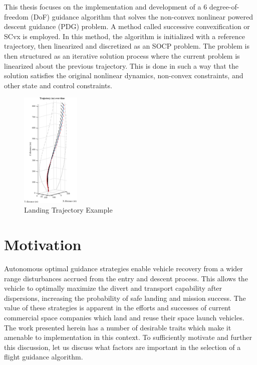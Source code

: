 This thesis focuses on the implementation and development of a 6 degree-of-freedom (DoF) guidance algorithm that solves the non-convex nonlinear powered descent guidance (PDG) problem. A method called successive convexification or SCvx is employed. In this method, the algorithm is initialized with a reference trajectory, then linearized and discretized as an SOCP problem. The problem is then structured as an iterative solution process where the current problem is linearized about the previous trajectory. This is done in such a way that the solution satisfies the original nonlinear dynamics, non-convex constraints, and other state and control constraints. 
\begin{figure}[!htbp] 
  \centering
  \includegraphics[width=0.25\textwidth]{figs/3dtraj_intro.eps}
  \caption{Landing Trajectory Example}
  \label{fig:intro}
 \end{figure}	



\section{Motivation}
Autonomous optimal guidance strategies enable vehicle recovery from a wider range disturbances accrued from the entry and descent process. This allows the vehicle to optimally maximize the divert and transport capability after dispersions, increasing the probability of safe landing and mission success. The value of these strategies is apparent in the efforts and successes of current commercial space companies which land and reuse their space launch vehicles. The work presented herein has a number of desirable traits which make it amenable to implementation in this context. To sufficiently motivate and further this discussion, let us discuss what factors are important in the selection of a flight guidance algorithm.



